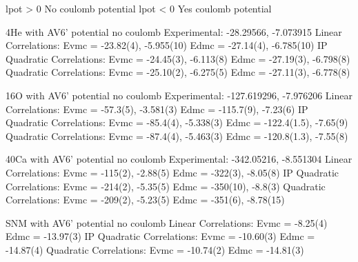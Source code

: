 lpot > 0 No coulomb potential
lpot < 0 Yes coulomb potential

4He with AV6' potential no coulomb
Experimental:
         -28.29566,     -7.073915
Linear Correlations:
Evmc  =  -23.82(4),     -5.955(10)
Edmc  =  -27.14(4),     -6.785(10)
IP Quadratic Correlations:
Evmc  =  -24.45(3),     -6.113(8)
Edmc  =  -27.19(3),     -6.798(8)
Quadratic Correlations:
Evmc  =  -25.10(2),     -6.275(5)
Edmc  =  -27.11(3),     -6.778(8)

16O with AV6' potential no coulomb
Experimental:
         -127.619296,   -7.976206
Linear Correlations:
Evmc  =  -57.3(5),      -3.581(3)
Edmc  =  -115.7(9),     -7.23(6)
IP Quadratic Correlations:
Evmc  =  -85.4(4),      -5.338(3)
Edmc  =  -122.4(1.5),   -7.65(9)   
Quadratic Correlations:
Evmc  =  -87.4(4),      -5.463(3)
Edmc  =  -120.8(1.3),   -7.55(8)

40Ca with AV6' potential no coulomb
Experimental:
         -342.05216,    -8.551304
Linear Correlations:
Evmc  =  -115(2),       -2.88(5)
Edmc  =  -322(3),       -8.05(8)
IP Quadratic Correlations:
Evmc  =  -214(2),       -5.35(5) 
Edmc  =  -350(10),      -8.8(3)
Quadratic Correlations:
Evmc  =  -209(2),       -5.23(5)
Edmc  =  -351(6),       -8.78(15)

SNM with AV6' potential no coulomb
Linear Correlations:
Evmc  =  -8.25(4)
Edmc  =  -13.97(3)
IP Quadratic Correlations:
Evmc  =  -10.60(3)
Edmc  =  -14.87(4)
Quadratic Correlations:
Evmc  =  -10.74(2)
Edmc  =  -14.81(3)

